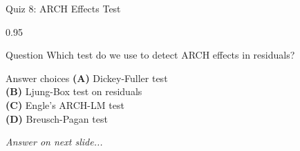 \documentclass[9pt, aspectratio=169, t]{beamer}
\begin{document}
\begin{frame}{Quiz 8: ARCH Effects Test}
    \begin{cminipage}{0.95\textwidth}
    \begin{alertblock}{Question}
        Which test do we use to detect ARCH effects in residuals?
    \end{alertblock}

    \vspace{0.4cm}

    \begin{block}{Answer choices}
        \textcolor{MainBlue}{\textbf{(A)}} Dickey-Fuller test\\[3pt]
        \textcolor{MainBlue}{\textbf{(B)}} Ljung-Box test on residuals\\[3pt]
        \textcolor{MainBlue}{\textbf{(C)}} Engle's ARCH-LM test\\[3pt]
        \textcolor{MainBlue}{\textbf{(D)}} Breusch-Pagan test
    \end{block}

    \vspace{0.5cm}

    \begin{center}
        \textit{Answer on next slide...}
    \end{center}
    \end{cminipage}
\end{frame}
\end{document}
